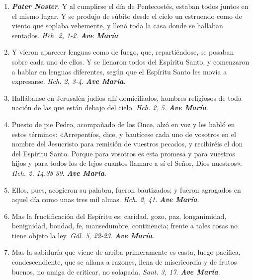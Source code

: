 \documentclass[11pt,a4paper]{book}
\begin{document}
    \begin{enumerate}
    
        \item \textbf{\emph{Pater Noster}}. Y al cumplirse el día de Pentecostés, estaban todos juntos en el mismo lugar. Y se produjo de súbito desde el cielo un estruendo como de viento 
            que soplaba vehemente, y llenó toda la casa donde se hallaban sentados. \emph{Hch. 2, 1-2}. \textbf{\emph{Ave María}}.

        \item Y vieron aparecer lenguas como de fuego, que, repartiéndose, se posaban sobre cada uno de ellos. Y se llenaron todos del Espíritu Santo, y comenzaron a hablar en lenguas diferentes, 
            según que el Espíritu Santo les movía a expresarse. \emph{Hch. 2, 3-4}. \textbf{\emph{Ave María}}.

        \item Hallábanse en Jerusalén judíos allí domiciliados, hombres religiosos de toda nación de las que están debajo del cielo. \emph{Hch. 2, 5}. \textbf{\emph{Ave María}}.

        \item Puesto de pie Pedro, acompañado de los Once, alzó en voz y les habló en estos términos: «Arrepentíos, dice, y bautícese cada uno de vosotros en el nombre del 
            Jesucristo para remisión de vuestros pecados, y recibiréis el don del Espíritu Santo. Porque para vosotros es esta promesa y para vuestros hijos y para todos los de lejos
            cuantos llamare a sí el Señor, Dios nuestros». \emph{Hch. 2, 14.38-39}. \textbf{\emph{Ave María}}.

        \item Ellos, pues, acogieron su palabra, fueron bautizados; y fueron agragados en aquel día como unas tres mil almas. \emph{Hch. 2, 41}. \textbf{\emph{Ave María}}.

        \item Mas la fructificación del Espíritu es: caridad, gozo, paz, longanimidad, benignidad, bondad, fe, mansedumbre, continencia; frente a tales cosas no tiene objeto la ley. 
            \emph{Gál. 5, 22-23}. \textbf{\emph{Ave María}}.

        \item Mas la sabiduría que viene de arriba primeramente es casta, luego pacífica, condescendiente, que se allana a razones, llena de misericordia y de frutos buenos, 
            no amiga de criticar, no solapada. \emph{Sant. 3, 17}. \textbf{\emph{Ave María}}.


\end{enumerate}
\end{document}

